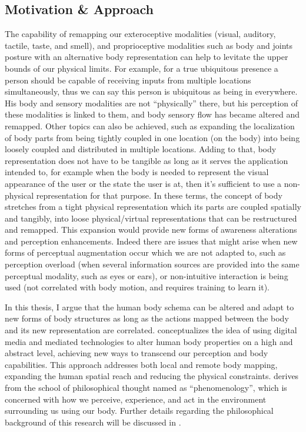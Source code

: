 


\subsection{Motivation \& Approach}

The capability of remapping our exteroceptive modalities (visual, auditory, tactile, taste, and smell), and proprioceptive modalities such as body and joints posture with an alternative body representation can help to levitate the upper bounds of our physical limits. For example, for a true ubiquitous presence a person should be capable of receiving inputs from multiple locations simultaneously, thus we can say this person is ubiquitous as being in everywhere. His body and sensory modalities are not ``physically'' there, but his perception of these modalities is linked to them, and body sensory flow has became altered and remapped. Other topics can also be achieved, such as expanding the localization of body parts from being tightly coupled in one location (on the body) into being loosely coupled and distributed in multiple locations. Adding to that, body representation does not have to be tangible as long as it serves the application intended to, for example when the body is needed to represent the visual appearance of the user or the state the user is at, then it's sufficient to use a non-physical representation for that purpose. In these terms, the concept of body stretches from a tight physical representation which its parts are coupled spatially and tangibly, into loose physical/virtual representations that can be restructured and remapped. This expansion would provide new forms of awareness alterations and perception enhancements. Indeed there are issues that might arise when new forms of perceptual augmentation occur which we are not adapted to, such as perception overload (when several information sources are provided into the same perceptual modality, such as eyes or ears), or non-intuitive interaction is being used (not correlated with body motion, and requires training to learn it). 

In this thesis, I argue that the human body schema can be altered and adapt to new forms of body structures as long as the actions mapped between the body and its new representation are correlated. \ProposalKeyword conceptualizes the idea of using digital media and mediated technologies to alter human body properties on a high and abstract level, achieving new ways to transcend our perception and body capabilities. This approach addresses both local and remote body mapping, expanding the human spatial reach and reducing the physical constraints. \ProposalKeyword derives from the school of philosophical thought named as ``phenomenology'', which is concerned with how we perceive, experience, and act in the environment surrounding us using our body. Further details regarding the philosophical background of this research will be discussed in . 

